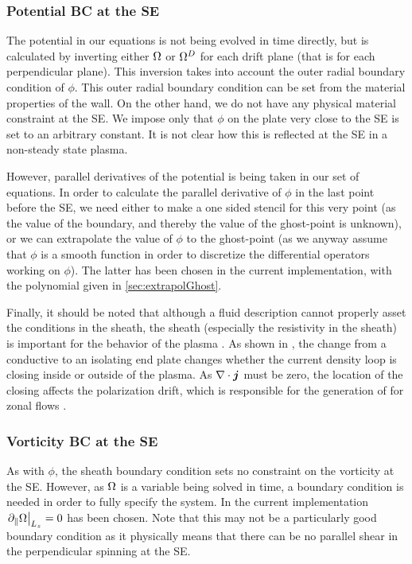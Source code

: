 \subsubsection{Potential BC at the SE}
%
The potential in our equations is not being evolved in time directly, but is calculated by inverting either $\Omega$ or $\Omega^D$ for each drift plane (that is for each perpendicular plane).
This inversion takes into account the outer radial boundary condition of $\phi$.
This outer radial boundary condition can be set from the material properties of the wall.
On the other hand, we do not have any physical material constraint at the SE.
We impose only that $\phi$ on the plate very close to the SE is set to an arbitrary constant.
It is not clear how this is reflected at the SE in a non-steady state plasma.

However, parallel derivatives of the potential is being taken in our set of equations.
In order to calculate the parallel derivative of $\phi$ in the last point before the SE, we need either to make a one sided stencil for this very point (as the value of the boundary, and thereby the value of the ghost-point is unknown), or we can extrapolate the value of $\phi$ to the ghost-point (as we anyway assume that $\phi$ is a smooth function in order to discretize the differential operators working on $\phi$).
The latter has been chosen in the current implementation, with the polynomial given in \cref{sec:extrapolGhost}.

Finally, it should be noted that although a fluid description cannot properly asset the conditions in the sheath, the sheath (especially the resistivity in the sheath) is important for the behavior of the plasma \cite{Oldenburger2012,Yamada2014}.
As shown in \cite{ChakrabortyThakur2013}, the change from a conductive to an isolating end plate changes whether the current density loop is closing inside or outside of the plasma. As $\nabla\cdot \boldsymbol{j}$ must be zero, the location of the closing affects the polarization drift, which is responsible for the generation of for  zonal flows \cite{Diamond1991}.

\subsubsection{Vorticity BC at the SE}
%
As with $\phi$, the sheath boundary condition sets no constraint on the vorticity at the SE.
However, as $\Omega$ is a variable being solved in time, a boundary condition is needed in order to fully specify the system.
In the current implementation $\left. \partial_\| \Omega \right|_{L_z} = 0$ has been chosen.
Note that this may not be a particularly good boundary condition as it physically means that there can be no parallel shear in the perpendicular spinning at the SE.

